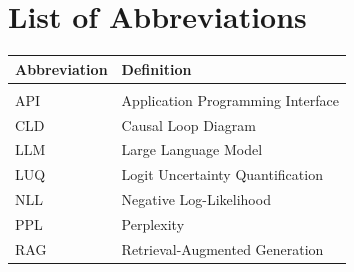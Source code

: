 
\section*{List of Abbreviations}

\begin{tabular}{@{}ll@{}}
\textbf{Abbreviation} & \textbf{Definition} \\[0.5ex]
\hline \\[-1.5ex]
API & Application Programming Interface \\
CLD & Causal Loop Diagram \\
LLM & Large Language Model \\
LUQ & Logit Uncertainty Quantification \\
NLL & Negative Log-Likelihood \\
PPL & Perplexity \\
RAG & Retrieval-Augmented Generation \\
\end{tabular}









